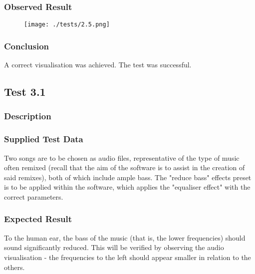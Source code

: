 \subsubsection*{Observed Result}
\label{sec:evidence2.5}
\begin{figure}[H]
	\texttt{[image: ./tests/2.5.png]}
\end{figure}

\subsubsection*{Conclusion}
A correct visualisation was achieved. The test was successful.


\pagebreak
\subsection{Test 3.1}
\subsubsection*{Description}
\paragraph{}
{
	\centering
}

\subsubsection*{Supplied Test Data}
Two songs are to be chosen as audio files, representative of the type of music often remixed (recall that the aim of the software is to assist in the creation of said remixes), both of which include ample bass. The "reduce bass" effects preset is to be applied within the software, which applies the "equaliser effect" with the correct parameters.

\subsubsection*{Expected Result}
To the human ear, the bass of the music (that is, the lower frequencies) should sound significantly reduced. This will be verified by observing the audio visualisation - the frequencies to the left should appear smaller in relation to the others.

